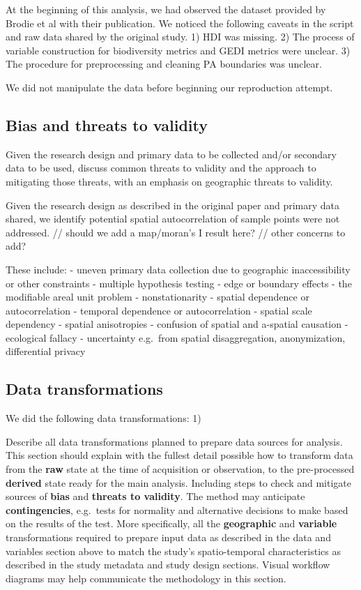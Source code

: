 \documentclass[
]{article}
\begin{document}
At the beginning of this analysis, we had observed the dataset provided
by Brodie et al with their publication. We noticed the following caveats
in the script and raw data shared by the original study. 1) HDI was
missing. 2) The process of variable construction for biodiversity
metrics and GEDI metrics were unclear. 3) The procedure for
preprocessing and cleaning PA boundaries was unclear.

We did not manipulate the data before beginning our reproduction
attempt.

\hypertarget{bias-and-threats-to-validity}{%
\subsection{Bias and threats to
validity}\label{bias-and-threats-to-validity}}

Given the research design and primary data to be collected and/or
secondary data to be used, discuss common threats to validity and the
approach to mitigating those threats, with an emphasis on geographic
threats to validity.

Given the research design as described in the original paper and primary
data shared, we identify potential spatial autocorrelation of sample
points were not addressed. // should we add a map/moran's I result here?
// other concerns to add?

These include: - uneven primary data collection due to geographic
inaccessibility or other constraints - multiple hypothesis testing -
edge or boundary effects - the modifiable areal unit problem -
nonstationarity - spatial dependence or autocorrelation - temporal
dependence or autocorrelation - spatial scale dependency - spatial
anisotropies - confusion of spatial and a-spatial causation - ecological
fallacy - uncertainty e.g.~from spatial disaggregation, anonymization,
differential privacy

\hypertarget{data-transformations}{%
\subsection{Data transformations}\label{data-transformations}}

We did the following data transformations: 1)

Describe all data transformations planned to prepare data sources for
analysis. This section should explain with the fullest detail possible
how to transform data from the \textbf{raw} state at the time of
acquisition or observation, to the pre-processed \textbf{derived} state
ready for the main analysis. Including steps to check and mitigate
sources of \textbf{bias} and \textbf{threats to validity}. The method
may anticipate \textbf{contingencies}, e.g.~tests for normality and
alternative decisions to make based on the results of the test. More
specifically, all the \textbf{geographic} and \textbf{variable}
transformations required to prepare input data as described in the data
and variables section above to match the study's spatio-temporal
characteristics as described in the study metadata and study design
sections. Visual workflow diagrams may help communicate the methodology
in this section.
\end{document}
